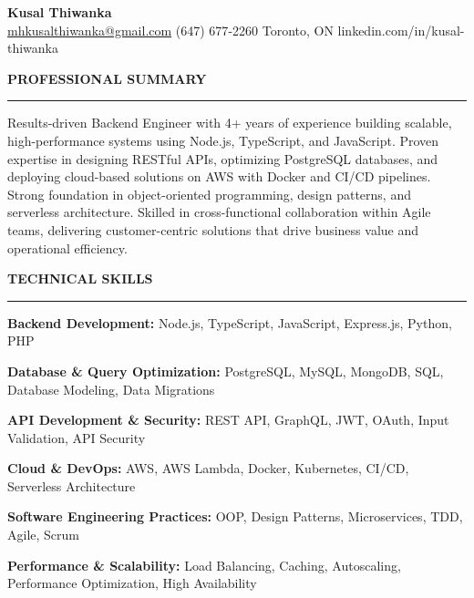 \documentclass[10pt,letterpaper]{article}
\begin{document}
\begin{center}
{\LARGE\textbf{Kusal Thiwanka}}\\[3pt]
\href{mailto:mhkusalthiwanka@gmail.com}{mhkusalthiwanka@gmail.com}\hspace{2em}%
(647) 677{-}2260\hspace{2em}%
Toronto, ON\hspace{2em}
linkedin.com/in/kusal-thiwanka
\end{center}

\vspace{6pt}

\textbf{PROFESSIONAL SUMMARY}\\[-8pt]
\noindent\rule{\textwidth}{1pt}

\vspace{-2pt}

Results-driven Backend Engineer with 4+ years of experience building scalable, high-performance systems using Node.js, TypeScript, and JavaScript. Proven expertise in designing RESTful APIs, optimizing PostgreSQL databases, and deploying cloud-based solutions on AWS with Docker and CI/CD pipelines. Strong foundation in object-oriented programming, design patterns, and serverless architecture. Skilled in cross-functional collaboration within Agile teams, delivering customer-centric solutions that drive business value and operational efficiency.

\vspace{8pt}

\textbf{TECHNICAL SKILLS}\\[-8pt]
\noindent\rule{\textwidth}{1pt}

\vspace{-2pt}

\textbf{Backend Development:} Node.js, TypeScript, JavaScript, Express.js, Python, PHP

\textbf{Database \& Query Optimization:} PostgreSQL, MySQL, MongoDB, SQL, Database Modeling, Data Migrations

\textbf{API Development \& Security:} REST API, GraphQL, JWT, OAuth, Input Validation, API Security

\textbf{Cloud \& DevOps:} AWS, AWS Lambda, Docker, Kubernetes, CI/CD, Serverless Architecture

\textbf{Software Engineering Practices:} OOP, Design Patterns, Microservices, TDD, Agile, Scrum

\textbf{Performance \& Scalability:} Load Balancing, Caching, Autoscaling, Performance Optimization, High Availability
\end{document}
